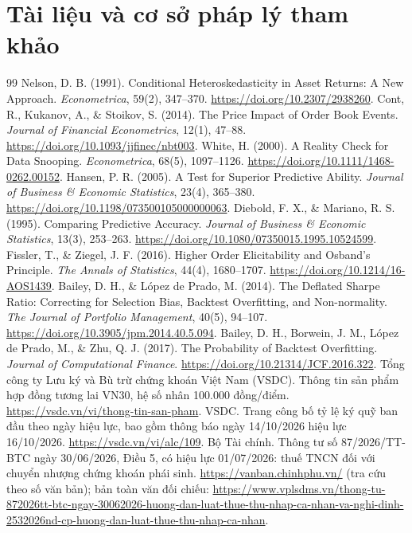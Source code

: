 \documentclass[12pt,a4paper,oneside]{article}
\begin{document}
\section{Tài liệu và cơ sở pháp lý tham khảo}
\begin{thebibliography}{99}
 Nelson, D. B. (1991). Conditional Heteroskedasticity in Asset Returns: A New Approach. \textit{Econometrica}, 59(2), 347--370. \url{https://doi.org/10.2307/2938260}.
 Cont, R., Kukanov, A., \& Stoikov, S. (2014). The Price Impact of Order Book Events. \textit{Journal of Financial Econometrics}, 12(1), 47--88. \url{https://doi.org/10.1093/jjfinec/nbt003}.
 White, H. (2000). A Reality Check for Data Snooping. \textit{Econometrica}, 68(5), 1097--1126. \url{https://doi.org/10.1111/1468-0262.00152}.
 Hansen, P. R. (2005). A Test for Superior Predictive Ability. \textit{Journal of Business \& Economic Statistics}, 23(4), 365--380. \url{https://doi.org/10.1198/073500105000000063}.
 Diebold, F. X., \& Mariano, R. S. (1995). Comparing Predictive Accuracy. \textit{Journal of Business \& Economic Statistics}, 13(3), 253--263. \url{https://doi.org/10.1080/07350015.1995.10524599}.
 Fissler, T., \& Ziegel, J. F. (2016). Higher Order Elicitability and Osband's Principle. \textit{The Annals of Statistics}, 44(4), 1680--1707. \url{https://doi.org/10.1214/16-AOS1439}.
 Bailey, D. H., \& López de Prado, M. (2014). The Deflated Sharpe Ratio: Correcting for Selection Bias, Backtest Overfitting, and Non-normality. \textit{The Journal of Portfolio Management}, 40(5), 94--107. \url{https://doi.org/10.3905/jpm.2014.40.5.094}.
 Bailey, D. H., Borwein, J. M., López de Prado, M., \& Zhu, Q. J. (2017). The Probability of Backtest Overfitting. \textit{Journal of Computational Finance}. \url{https://doi.org/10.21314/JCF.2016.322}.
 Tổng công ty Lưu ký và Bù trừ chứng khoán Việt Nam (VSDC). Thông tin sản phẩm hợp đồng tương lai VN30, hệ số nhân 100.000 đồng/điểm. \url{https://vsdc.vn/vi/thong-tin-san-pham}.
 VSDC. Trang công bố tỷ lệ ký quỹ ban đầu theo ngày hiệu lực, bao gồm thông báo ngày 14/10/2026 hiệu lực 16/10/2026. \url{https://vsdc.vn/vi/alc/109}.
 Bộ Tài chính. Thông tư số 87/2026/TT-BTC ngày 30/06/2026, Điều 5, có hiệu lực 01/07/2026: thuế TNCN đối với chuyển nhượng chứng khoán phái sinh. \url{https://vanban.chinhphu.vn/} (tra cứu theo số văn bản); bản toàn văn đối chiếu: \url{https://www.vplsdms.vn/thong-tu-872026tt-btc-ngay-30062026-huong-dan-luat-thue-thu-nhap-ca-nhan-va-nghi-dinh-2532026nd-cp-huong-dan-luat-thue-thu-nhap-ca-nhan}.

\end{thebibliography}
\end{document}
